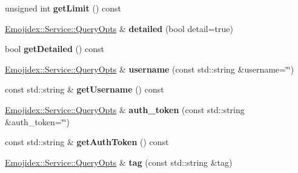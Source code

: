 \begin{DoxyCompactItemize}
\item 
unsigned int {\bfseries get\+Limit} () const \hypertarget{classEmojidex_1_1Service_1_1QueryOpts_a1ad7569bc9fb0ab58ededdad2977e00f}{}\label{classEmojidex_1_1Service_1_1QueryOpts_a1ad7569bc9fb0ab58ededdad2977e00f}

\item 
\hyperlink{classEmojidex_1_1Service_1_1QueryOpts}{Emojidex\+::\+Service\+::\+Query\+Opts} \& {\bfseries detailed} (bool detail=true)\hypertarget{classEmojidex_1_1Service_1_1QueryOpts_a3cca92ff06d005a40e768ea9157721b6}{}\label{classEmojidex_1_1Service_1_1QueryOpts_a3cca92ff06d005a40e768ea9157721b6}

\item 
bool {\bfseries get\+Detailed} () const \hypertarget{classEmojidex_1_1Service_1_1QueryOpts_ae48076b7bd5daa429ebea6f767e5304f}{}\label{classEmojidex_1_1Service_1_1QueryOpts_ae48076b7bd5daa429ebea6f767e5304f}

\item 
\hyperlink{classEmojidex_1_1Service_1_1QueryOpts}{Emojidex\+::\+Service\+::\+Query\+Opts} \& {\bfseries username} (const std\+::string \&username=\char`\"{}\char`\"{})\hypertarget{classEmojidex_1_1Service_1_1QueryOpts_ae4216a7709c4ecda00f5f347662f8f65}{}\label{classEmojidex_1_1Service_1_1QueryOpts_ae4216a7709c4ecda00f5f347662f8f65}

\item 
const std\+::string \& {\bfseries get\+Username} () const \hypertarget{classEmojidex_1_1Service_1_1QueryOpts_ad36b0b5169a96133f3f55db3322bf754}{}\label{classEmojidex_1_1Service_1_1QueryOpts_ad36b0b5169a96133f3f55db3322bf754}

\item 
\hyperlink{classEmojidex_1_1Service_1_1QueryOpts}{Emojidex\+::\+Service\+::\+Query\+Opts} \& {\bfseries auth\+\_\+token} (const std\+::string \&auth\+\_\+token=\char`\"{}\char`\"{})\hypertarget{classEmojidex_1_1Service_1_1QueryOpts_acca0bdf9bffb60ac767cff0506bc0fcc}{}\label{classEmojidex_1_1Service_1_1QueryOpts_acca0bdf9bffb60ac767cff0506bc0fcc}

\item 
const std\+::string \& {\bfseries get\+Auth\+Token} () const \hypertarget{classEmojidex_1_1Service_1_1QueryOpts_a26f673a87e58f3576e507321cb879eb8}{}\label{classEmojidex_1_1Service_1_1QueryOpts_a26f673a87e58f3576e507321cb879eb8}

\item 
\hyperlink{classEmojidex_1_1Service_1_1QueryOpts}{Emojidex\+::\+Service\+::\+Query\+Opts} \& {\bfseries tag} (const std\+::string \&tag)\hypertarget{classEmojidex_1_1Service_1_1QueryOpts_ab0d2aa112c6ad9c9dadaec0e48b39f3d}{}\label{classEmojidex_1_1Service_1_1QueryOpts_ab0d2aa112c6ad9c9dadaec0e48b39f3d}


\end{DoxyCompactItemize}
